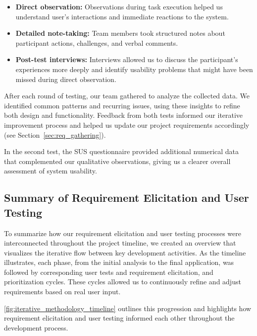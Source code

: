 \begin{itemize}
    \item \textbf{Direct observation:}
    Observations during task execution helped us understand user's interactions and immediate reactions to the system.
    \item \textbf{Detailed note-taking:}
    Team members took structured notes about participant actions, challenges, and verbal comments.
    \item \textbf{Post-test interviews:}
    Interviews allowed us to discuss the participant’s experiences more deeply and identify usability problems that might have been missed during direct observation. 
\end{itemize}

After each round of testing, our team gathered to analyze the collected data. We identified common patterns and recurring issues, using these insights to refine both design and functionality. Feedback from both tests informed our iterative improvement process and helped us update our project requirements accordingly (see Section~\ref{sec:req_gathering}).

In the second test, the SUS questionnaire provided additional numerical data that complemented our qualitative observations, giving us a clearer overall assessment of system usability.


\subsection*{Summary of Requirement Elicitation and User Testing}

To summarize how our requirement elicitation and user testing processes were interconnected throughout the project timeline, we created an overview that visualizes the iterative flow between key development activities. As the timeline illustrates, each phase, from the initial analysis to the final application, was followed by corresponding user tests and requirement elicitation, and prioritization cycles. These cycles allowed us to continuously refine and adjust requirements based on real user input. 

\autoref{fig:iterative_methodology_timeline} outlines this progression and highlights how requirement elicitation and user testing informed each other throughout the development process.

